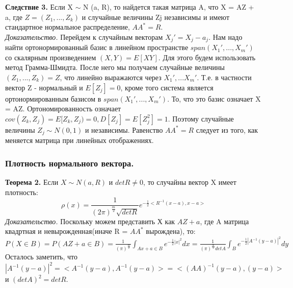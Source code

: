 \textbf{Следствие 3.} Если X $\sim$ N (a, R), то найдется такая матрица A, что X = AZ + a, где
$Z = (Z_1, ..., Z_k)$ и случайные величины Zj независимы и имеют стандартное нормальное распределение, $AA^* = R$.\\
\textit{Доказательство.} Перейдем к случайным векторам $X_j' = X_j - a_j$. Нам надо найти ортонормированный базис в линейном пространстве $span(X_1', ..., X_m')$ со скалярным произведением $(X, Y) = E[XY]$. Для этого будем использовать метод Грамма-Шмидта. После него мы получаем случайные величины $(Z_1, ..., Z_k) = Z$, что линейно выражаются через $X_1', ... X_m'$. Т.е. в частности вектор Z - нормальный и $E[Z_j] = 0$, кроме того система является ортонормированным базисом в $span(X_1', ..., X_m')$. То, что это базис означает X = AZ. Ортономированность означает $cov(Z_k, Z_j) = E[Z_k, Z_j) = 0, D[Z_j] = E[Z_j^2] = 1$. Поэтому случайные величины $Z_j \sim N(0, 1)$ и независимы. Равенство $AA^* = R$ следует из того, как меняется матрица при линейных отображениях.
\\

\subsubsection{Плотность нормального вектора.}

\textbf{Теорема 2.} Если $X\sim N(a, R)$ и $detR \neq 0$, то случайны вектор X имеет плотность:\\
$$\rho(x) = \frac{1}{(2\pi)^{\frac{m}{2}} \sqrt{detR}}e^{-\frac{1}{2}<R^{-1}(x - a), x - a>}$$
\textit{Доказательство.} Поскольку можем представить Х как $AZ + a$, где A матрица квадртная и невырожденная(иначе R = $AA^*$ вырождена), то:\\
$P(X \in B) = P(AZ + a \in B) = \frac{1}{(\pi)^{\frac{m}{2}}}\int_{Ax + a \in B} e^{-\frac{1}{2}|x|^2}dx = \frac{1}{(\pi)^{\frac{m}{2}}detA}\int_{B} e^{-\frac{1}{2}|A^{-1}(y - a)|^2}dy$\\
Осталось заметить, что $|A^{-1}(y - a)|^2 = <A^{-1}(y - a), A^{-1}(y - a)> = <(AA)^{-1}(y - a), (y - a)>$ и $(detA)^2 = detR$.
